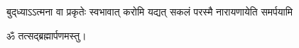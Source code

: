 
{बुद्‌ध्याऽऽत्मना वा प्रकृतेः स्वभावात्}
{करोमि यद्यत् सकलं परस्मै}
{नारायणायेति समर्पयामि}

\centerline{ॐ तत्सद्ब्रह्मार्पणमस्तु।}

\closesub


\closesection
